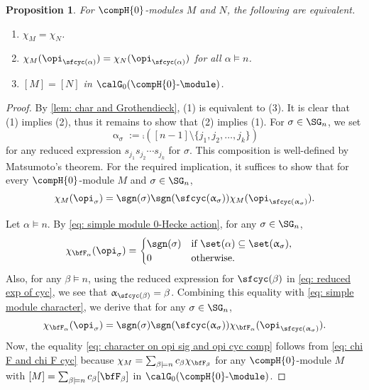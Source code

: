 \documentclass[12pt, reqno]{amsart}
\theoremstyle{plain}
\newtheorem{proposition}[proposition]{Proposition}
\theoremstyle{definition}
\numberwithin{equation}{section}
\numberwithin{figure}{section}
\numberwithin{table}{section}
\begin{document}
\begin{proposition}\label{prop: four equivalence relation on 0 Hecke}
For $\compH{0}$-modules $M$ and $N$,  the following are equivalent.
\begin{enumerate}[label = {\rm (\arabic*)}]
\item $\chi_M = \chi_N$.
\item $\chi_M(\opi_{\sfcyc(\alpha)}) = \chi_N(\opi_{\sfcyc(\alpha)})$ for all $\alpha \models n$.
\item $[M] = [N]$ in $\calG_0(\compH{0}\text{-}\module)$.
\end{enumerate}
\end{proposition}
\begin{proof}
By \cref{lem: char and Grothendieck}, (1) is equivalent to (3).
It is clear that (1) implies (2), thus it remains to show that (2) implies (1).
For $\sigma \in \SG_n$, we set  
\[
\upalpha_{\sigma} := \comp([n-1] \setminus \{j_1, j_2, \ldots, j_k\})
\]
for any reduced expression $s_{j_1} s_{j_2} \cdots s_{j_k}$ for  $\sigma$.
This composition is well-defined by 
Matsumoto's theorem.
For the required implication, it suffices to show that for every $\compH{0}$-module $M$ and $\sigma \in \SG_n$,
\begin{align}\label{eq: character on opi sig and opi cyc comp}
\chi_{M}(\opi_{\sigma}) =  \sgn(\sigma)  \sgn(\sfcyc(\upalpha_{\sigma}))
\chi_{M}(\opi_{\sfcyc(\upalpha_{\sigma})}).
\end{align}


Let $\alpha \models n$.
By \cref{eq: simple module 0-Hecke action}, for any $\sigma \in \SG_n$,
\begin{align}\label{eq: simple module character}
&\chi_{\bfF_{\alpha}}(\opi_{\sigma}) = \begin{cases}
\sgn(\sigma) & \text{if $\set(\alpha) \subseteq \set(\upalpha_{\sigma})$,}\\
0 & \text{otherwise.}
\end{cases}
\end{align}
Also, for any $\beta \models n$, using the reduced expression for $\sfcyc(\beta)$ in \cref{eq: reduced exp of cyc}, we see that $\upalpha_{\sfcyc(\beta)} = \beta$.
Combining this equality with \cref{eq: simple module character}, we derive that for any $\sigma \in \SG_n$,
\begin{align}\label{eq: chi F and chi F cyc}
\chi_{\bfF_{\alpha}}(\opi_{\sigma}) 
= \sgn(\sigma)  \sgn(\sfcyc(\upalpha_{\sigma}))
\chi_{\bfF_{\alpha}}(\opi_{\sfcyc(\upalpha_{\sigma})}).
\end{align}
Now, the equality \cref{eq: character on opi sig and opi cyc comp} follows from \cref{eq: chi F and chi F cyc} because $\chi_M = \sum_{\beta \models n} c_{\beta} \chi_{\bfF_{\beta}}$ for any $\compH{0}$-module $M$ with $[M] = \sum_{\beta \models n} c_\beta [\bfF_\beta]$ in $\calG_0(\compH{0}\text{-}\module)$.
\end{proof}
\end{document}

